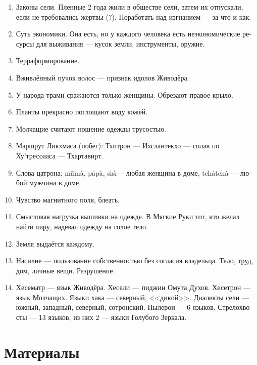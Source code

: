 \documentclass[a4paper,12pt,fleqn]{book}\usepackage{polyglossia}\setdefaultlanguage[babelshorthands=true]{russian}\setotherlanguage{english}\defaultfontfeatures{Ligatures=TeX,Mapping=tex-text}\usepackage{xcolor}\newcommand{\ml}[3]{#2}
\begin{document}
{\begin{enumerate}
\item Законы сели.
Пленные 2 года жили в обществе сели, затем их отпускали, если не требовались жертвы (?).
Поработать над изгнанием --- за что и как.

\item Суть экономики.
Она есть, но у каждого человека есть неэкономические ресурсы для выживания --- кусок земли, инструменты, оружие.

\item Терраформирование.

\item Вживлённый пучок волос --- признак идолов Живодёра.

\item У народа трами сражаются только женщины.
Обрезают правое крыло.

\item Планты прекрасно поглощают воду кожей.

\item Молчащие считают ношение одежды трусостью.

\item Маршрут Ликхмаса (побег): Тхитрон --- Ихслантекхо --- сплав по Ху'тресоааса --- Тхартавирт.

\item Слова цатрона: m\=am\`a, p\r{a}p\`a, s\r{\i}s\`\i --- любая женщина в доме, tch\'atch\`a --- любой мужчина в доме.

\item Чувство магнитного поля, блеать.

\item Смысловая нагрузка вышивки на одежде.
В Мягкие Руки тот, кто желал найти пару, надевал одежду на голое тело.

\item Земля выдаётся каждому.

\item Насилие --- пользование собственностью без согласия владельца.
Тело, труд, дом, личные вещи.
Разрушение.

\item Хесематр --- язык Живодёра.
Хесели --- пиджин Омута Духов.
Хесетрон --- язык Молчащих.
Языки хака --- северный, <<дикий>>.
Диалекты сели --- южный, западный, северный, сотронский.
Пылерои --- 6 языков. Стрелохвосты --- 13 языков, из них 2 --- языки Голубого Зеркала.
\end{enumerate}

\section{Материалы}

}
\end{document}
